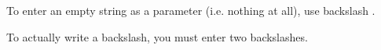 \item[Empty string]{
To enter an empty string as a parameter (i.e. nothing at all), use backslash \bxshell{$\backslash$}.

To actually write a backslash, you must enter two backslashes. 
}